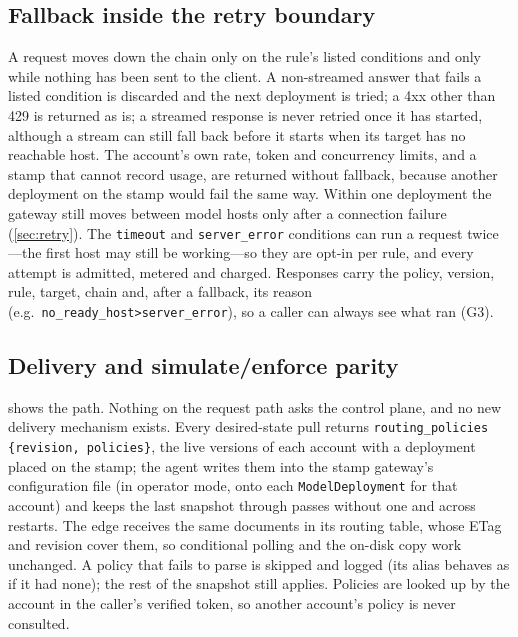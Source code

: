\documentclass[conference,letterpaper]{IEEEtran}
\newcommand{\code}[1]{\texttt{\small #1}}
\begin{document}
\subsection{Fallback inside the retry boundary}
A request moves down the chain only on the rule's listed conditions and only while nothing has
been sent to the client. A non-streamed answer that fails a listed condition is discarded and
the next deployment is tried; a 4xx other than 429 is returned as is; a streamed response is
never retried once it has started, although a stream can still fall back before it starts when
its target has no reachable host. The account's own rate, token and concurrency limits, and a
stamp that cannot record usage, are returned without fallback, because another deployment on
the stamp would fail the same way. Within one deployment the gateway still moves between
model hosts only after a connection failure (\cref{sec:retry}). The \code{timeout} and
\code{server\_error} conditions can run a request twice---the first host may still be
working---so they are opt-in per rule, and every attempt is admitted, metered and charged.
Responses carry the policy, version, rule, target, chain and, after a fallback, its reason
(e.g.\ \code{no\_ready\_host>server\_error}), so a caller can always see what ran (G3).

\subsection{Delivery and simulate/enforce parity}
\label{sec:policy-delivery}
 shows the path. Nothing on the request path asks the control plane, and no
new delivery mechanism exists. Every desired-state pull returns
\code{routing\_policies\,\{revision, policies\}}, the live versions of each account with a
deployment placed on the stamp; the agent writes them into the stamp gateway's configuration
file (in operator mode, onto each \code{ModelDeployment} for that account) and keeps the last
snapshot through passes without one and across restarts. The edge receives the same documents
in its routing table, whose ETag and revision cover them, so conditional polling and the
on-disk copy work unchanged. A policy that fails to parse is skipped and logged (its alias
behaves as if it had none); the rest of the snapshot still applies. Policies are looked up by
the account in the caller's verified token, so another account's policy is never consulted.
\end{document}
